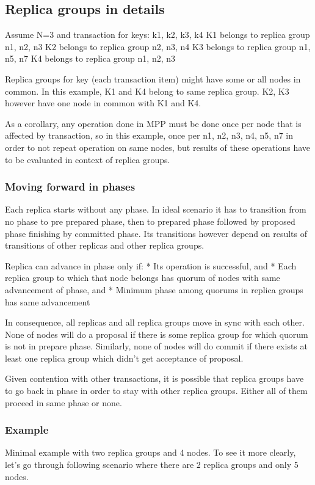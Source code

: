 \subsection{Replica groups in details}
Assume N=3 and transaction for keys: k1, k2, k3, k4 
K1 belongs to replica group n1, n2, n3
K2 belongs to replica group n2, n3, n4
K3 belongs to replica group n1, n5, n7
K4 belongs to replica group n1, n2, n3


Replica groups for key (each transaction item) might have some or all nodes in common.
In this example, K1 and K4 belong to same replica group. K2, K3 however have one node in common with K1 and K4.


As a corollary, any operation done in MPP must be done once per node that is affected by transaction, so in this example, once per n1, n2, n3, n4, n5, n7 in order to not repeat operation on same nodes, but results of these operations have to be evaluated in context of replica groups. 


\subsubsection{Moving forward in phases}
Each replica starts without any phase. In ideal scenario it has to transition from no phase to pre prepared phase, then to prepared phase followed by proposed phase finishing by committed phase. Its transitions however depend on results of transitions of other replicas and other replica groups.


Replica can advance in phase only if:
* Its operation is successful, and
* Each replica group to which that node belongs has quorum of nodes with same advancement of phase, and
* Minimum phase among quorums in replica groups has same advancement


In consequence, all replicas and all replica groups move in sync with each other. None of nodes will do a proposal if there is some replica group for which quorum is not in prepare phase. Similarly, none of nodes will do commit if there exists at least one replica group which didn’t get acceptance of proposal.


Given contention with other transactions, it is possible that replica groups have to go back in phase in order to stay with other replica groups. Either all of them proceed in same phase or none.


\subsubsection{Example}
Minimal example with two replica groups and 4 nodes.
To see it more clearly, let’s go through following scenario where there are 2 replica groups and only 5 nodes. 


